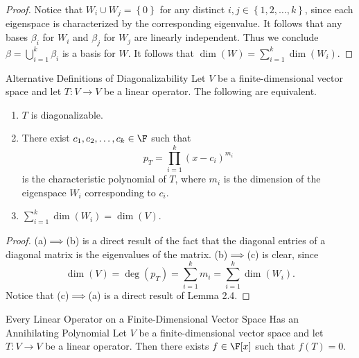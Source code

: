 \documentclass[math_245.tex]{subfiles}
\begin{document}
    \begin{proof}
        Notice that $W_i\cup W_j = \left\lbrace 0 \right\rbrace$ for any distinct $i,j\in \left\lbrace 1, 2, \ldots, k \right\rbrace$, since each eigenspace is characterized by the corresponding eigenvalue. It follows that any bases $\beta_i$ for $W_i$ and $\beta_j$ for $W_j$ are linearly independent. Thus we conclude $\beta=\bigcup^{k}_{i=1} \beta_i$ is a basis for $W$. It follows that $\dim \left( W \right) = \sum^{k}_{i=1} \dim(W_i)$. 
    \end{proof}

    \begin{prop}{Alternative Definitions of Diagonalizability}
        Let $V$ be a finite-dimensional vector space and let $T:V\to V$ be a linear operator. The following are equivalent.
        \begin{enumerate}
            \item $T$ is diagonalizable.
            \item There exist $c_1, c_2, \ldots, c_k\in \F$ such that
                \begin{equation*}
                    p_T = \prod^{k}_{i=1} (x-c_i)^{m_i}
                \end{equation*}
                is the characteristic polynomial of $T$, where $m_i$ is the dimension of the eigenspace $W_i$ corresponding to $c_i$.
            \item $\sum^{k}_{i=1} \dim(W_i) = \dim(V)$.
        \end{enumerate}
    \end{prop}

    \begin{proof}
        (a)$\implies$(b) is a direct result of the fact that the diagonal entries of a diagonal matrix is the eigenvalues of the matrix. (b)$\implies$(c) is clear, since
        \begin{equation*}
            \dim(V) = \deg(p_T) = \sum^{k}_{i=1} m_i = \sum^{k}_{i=1} \dim(W_i).  
        \end{equation*}
        Notice that (c)$\implies$(a) is a direct result of Lemma 2.4.
    \end{proof}

    \begin{prop}{Every Linear Operator on a Finite-Dimensional Vector Space Has an Annihilating Polynomial}
        Let $V$ be a finite-dimensional vector space and let $T:V\to V$ be a linear operator. Then there exists $f\in \F[x]$ such that $f(T) = 0$.
    \end{prop}
\end{document}
